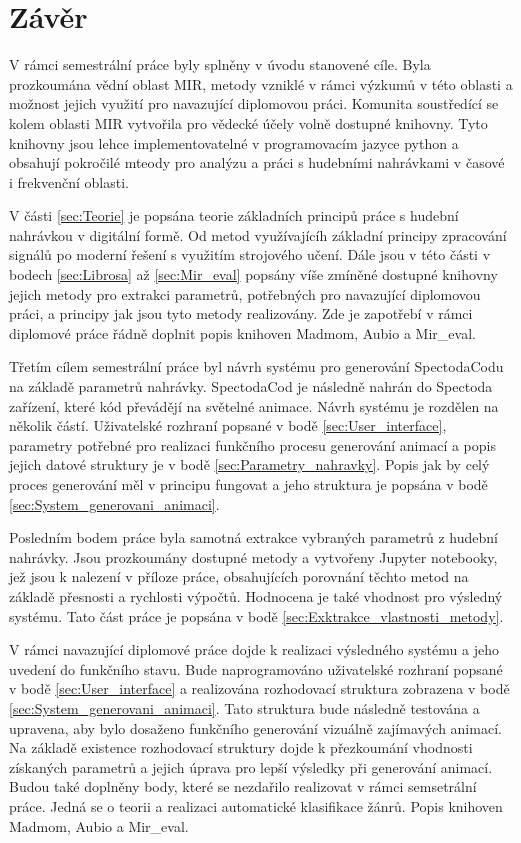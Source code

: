 \chapter*{Závěr}
{}

V rámci semestrální práce byly splněny v úvodu stanovené cíle. Byla prozkoumána vědní oblast \acs{MIR}, metody vzniklé v rámci výzkumů v této oblasti a možnost jejich využití pro navazující diplomovou práci. Komunita soustředící se kolem oblasti \acs{MIR} vytvořila pro vědecké účely volně dostupné knihovny. Tyto knihovny jsou lehce implementovatelné v programovacím jazyce python a obsahují pokročilé mteody pro analýzu a práci s hudebními nahrávkami v časové i frekvenční oblasti.

V části \ref{sec:Teorie} je popsána teorie základních principů práce s hudební nahrávkou v digitální formě. Od metod využívajícíh základní principy zpracování signálů po moderní řešení s využitím strojového učení. Dále jsou v této části v bodech \ref{sec:Librosa} až \ref{sec:Mir_eval} popsány víše zmíněné dostupné knihovny jejich metody pro extrakci parametrů, potřebných pro navazující diplomovou práci, a principy jak jsou tyto metody realizovány. Zde je zapotřebí v rámci diplomové práce řádně doplnit popis knihoven Madmom, Aubio a Mir\_eval.

Třetím cílem semestrální práce byl návrh systému pro generování SpectodaCodu na základě parametrů nahrávky. SpectodaCod je následně nahrán do Spectoda zařízení, které kód převádějí na světelné animace. Návrh systému je rozdělen na několik částí. Uživatelské rozhraní popsané v bodě \ref{sec:User_interface}, parametry potřebné pro realizaci funkčního procesu generování animací a popis jejich datové struktury je v bodě \ref{sec:Parametry_nahravky}. Popis jak by celý proces generování měl v principu fungovat a jeho struktura je popsána v bodě \ref{sec:System_generovani_animaci}.

Posledním bodem práce byla samotná extrakce vybraných parametrů z hudební nahrávky. Jsou prozkoumány dostupné metody a vytvořeny Jupyter notebooky, jež jsou k nalezení v příloze práce, obsahujících porovnání těchto metod na základě přesnosti a rychlosti výpočtů. Hodnocena je také vhodnost pro výsledný systému. Tato část práce je popsána v bodě \ref{sec:Exktrakce_vlastnosti_metody}.

V rámci navazující diplomové práce dojde k realizaci výsledného systému a jeho uvedení do funkčního stavu. Bude naprogramováno uživatelské rozhraní popsané v bodě \ref{sec:User_interface} a realizována rozhodovací struktura zobrazena v bodě \ref{sec:System_generovani_animaci}. Tato struktura bude následně testována a upravena, aby bylo dosaženo funkčního generování vizuálně zajímavých animací. Na základě existence rozhodovací struktury dojde k přezkoumání vhodnosti získaných parametrů a jejich úprava pro lepší výsledky při generování animací. Budou také doplněny body, které se nezdařilo realizovat v rámci semsetrální práce. Jedná se o teorii a realizaci automatické klasifikace žánrů. Popis knihoven Madmom, Aubio a Mir\_eval.


